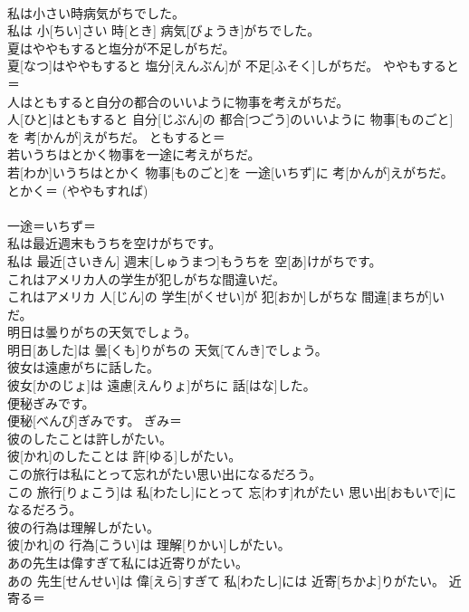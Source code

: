 \documentclass[8pt]{extreport}
\begin{document}
\begin{CJK}{UTF8}{min}
\\	私は小さい時病気がちでした。	
\\	私は 小[ちい]さい 時[とき] 病気[びょうき]がちでした。	
\\	夏はややもすると塩分が不足しがちだ。	
\\	夏[なつ]はややもすると 塩分[えんぶん]が 不足[ふそく]しがちだ。	ややもすると＝ 
\\	人はともすると自分の都合のいいように物事を考えがちだ。	
\\	人[ひと]はともすると 自分[じぶん]の 都合[つごう]のいいように 物事[ものごと]を 考[かんが]えがちだ。	ともすると＝ 
\\	若いうちはとかく物事を一途に考えがちだ。	
\\	若[わか]いうちはとかく 物事[ものごと]を 一途[いちず]に 考[かんが]えがちだ。	とかく＝ (ややもすれば) 
\\	[(よくないことを)あれこれ] 
\\	一途＝いちず＝ 
\\	私は最近週末もうちを空けがちです。	
\\	私は 最近[さいきん] 週末[しゅうまつ]もうちを 空[あ]けがちです。	
\\	これはアメリカ人の学生が犯しがちな間違いだ。	
\\	これはアメリカ 人[じん]の 学生[がくせい]が 犯[おか]しがちな 間違[まちが]いだ。	
\\	明日は曇りがちの天気でしょう。	
\\	明日[あした]は 曇[くも]りがちの 天気[てんき]でしょう。	
\\	彼女は遠慮がちに話した。	
\\	彼女[かのじょ]は 遠慮[えんりょ]がちに 話[はな]した。	
\\	便秘ぎみです。	
\\	便秘[べんぴ]ぎみです。	ぎみ＝ 
\\	彼のしたことは許しがたい。	
\\	彼[かれ]のしたことは 許[ゆる]しがたい。	
\\	この旅行は私にとって忘れがたい思い出になるだろう。	
\\	この 旅行[りょこう]は 私[わたし]にとって 忘[わす]れがたい 思い出[おもいで]になるだろう。	
\\	彼の行為は理解しがたい。	
\\	彼[かれ]の 行為[こうい]は 理解[りかい]しがたい。	
\\	あの先生は偉すぎて私には近寄りがたい。	
\\	あの 先生[せんせい]は 偉[えら]すぎて 私[わたし]には 近寄[ちかよ]りがたい。	近寄る＝ 

\end{CJK}
\end{document}
